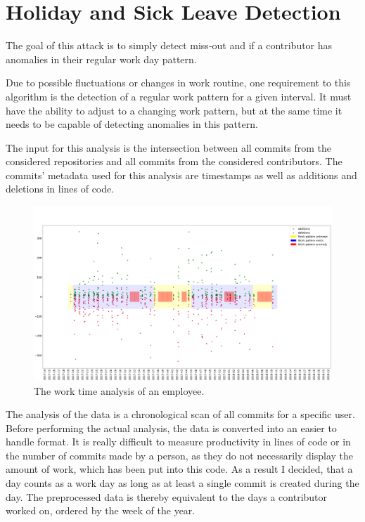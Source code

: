\section{Holiday and Sick Leave Detection}

The goal of this attack is to simply detect miss-out and if a contributor has anomalies in their regular work day pattern.

Due to possible fluctuations or changes in work routine, one requirement to this algorithm is the detection of a regular work pattern for a given interval.
It must have the ability to adjust to a changing work pattern, but at the same time it needs to be capable of detecting anomalies in this pattern.

The input for this analysis is the intersection between all commits from the considered repositories and all commits from the considered contributors.
The commits' metadata used for this analysis are timestamps as well as additions and deletions in lines of code.

\begin{figure}[H]
    \includegraphics[scale=0.20]{./graphs/analysis/work-time-analysis}
    \centering
    \caption{The work time analysis of an employee.}\label{fig:missing-time}
\end{figure}

The analysis of the data is a chronological scan of all commits for a specific user.
Before performing the actual analysis, the data is converted into an easier to handle format.
It is really difficult to measure productivity in lines of code or in the number of commits made by a person, as they do not necessarily display the amount of work, which has been put into this code.
As a result I decided, that a day counts as a work day as long as at least a single commit is created during the day.
The preprocessed data is thereby equivalent to the days a contributor worked on, ordered by the week of the year.

